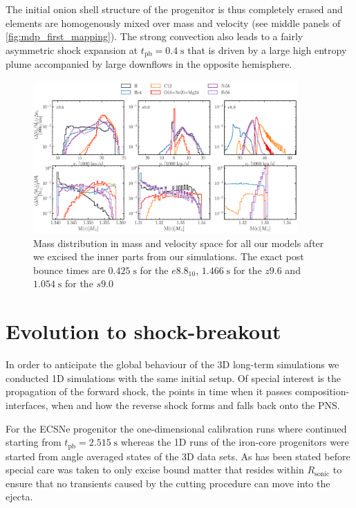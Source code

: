 \documentclass[fleqn,usenatbib]{mnras}
\begin{document}
The initial onion shell structure of the progenitor is thus completely erased and elements are homogenously mixed over mass and velocity (see middle panels of \autoref{fig:mdp_first_mapping}).
The strong convection also leads to a fairly asymmetric shock expansion at $t_{\mathrm{pb}}=0.4\;\mathrm{s}$ that is driven by a large high entropy plume accompanied by large downflows in the opposite hemisphere. 

\begin{figure}
 \centering
 \includegraphics[width=0.9\textwidth]{pic/z96_s9_e8_massDis_mvr_and_masstime_0.pdf}
 \caption{Mass distribution in mass and velocity space for all our models after we excised the inner parts from our simulations. The exact post bounce times are $0.425 \;\mathrm{s}$ for the $e8.8_{10}$, $1.466 \;\mathrm{s}$ for the $z9.6$ and $1.054 \;\mathrm{s}$ for the $s9.0$ }
 \label{fig:mdp_first_mapping}
\end{figure}

\section{Evolution to shock-breakout}
In order to anticipate the global behaviour of the 3D long-term simulations we conducted 1D simulations with the same initial setup. Of special interest is the propagation of the forward shock, the points in time when it passes composition-interfaces, when and how the reverse shock forms and falls back onto the PNS.

For the ECSNe progenitor the one-dimensional calibration runs where continued starting from $t_{\mathrm{pb}} = 2.515 \;\mathrm{s}$ whereas the 1D runs of the iron-core progenitors were started from angle averaged states of the 3D data sets. 
As has been stated before special care was taken to only excise bound matter that resides within $R_{\mathrm{sonic}}$
to ensure that no transients caused by the cutting procedure can move into the ejecta.
\end{document}
